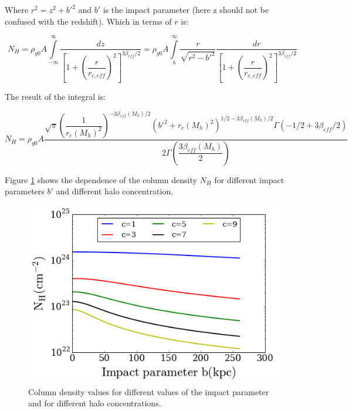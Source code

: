 \documentclass[12pt]{article}
\begin{document}
Where $r^2 = z^2 + b'^2$ and $b'$ is the impact parameter (here z
should not be confused with the redshift).
Which in terms of $r$ is:

\begin{equation}
N_{H} = \rho_{g0}A \int \limits_{-\infty}^{\infty} \dfrac{dz}{\left
[ 1 + \left(\dfrac{r}{r_{c,eff}} \right)^2 \right]^{3\beta_{eff}/2}}
= \rho_{g0}A \int \limits_{b}^{\infty}\dfrac{r}{\sqrt{r^2 - b'^2}}\dfrac{dr}
{\left [ 1 + \left(\dfrac{r}{r_{c,eff}} \right)^2 \right]^{3\beta_{eff}/2}}
\end{equation}

The result of the integral is:

\begin{equation}\label{eq:NH}
N_{H} = \rho_{g0} A\dfrac{\sqrt{\pi} (\dfrac{1}{r_c(M_h)^2})^{-3\beta_{eff}(M_h) /2} (b'^2 + r_c(M_h)^2)^{1/2 - 3\beta_{eff}(M_h)/2} \Gamma(-1/2 + 3\beta_{eff}/2) }{2 \Gamma(\dfrac{3\beta_{eff}(M_h)}{2})}
\end{equation}


Figure \ref{fig:NHb} shows the dependence of the column density $N_H$
for different impact parameters $b'$ and different halo concentration.
\begin{figure}[H]
\centering
\includegraphics[scale=0.7]{../code/env/NH-b.png}
\caption{Column density values for different values of the impact
parameter and for different halo concentrations.\label{fig:NHb}}
\end{figure}


\end{document}
